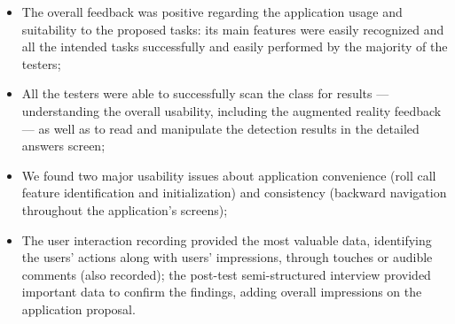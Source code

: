 \begin{itemize}
    \item The overall feedback was positive regarding the application usage and suitability to the proposed tasks: its main features were easily recognized and all the intended tasks successfully and easily performed by the majority of the testers;

    \item All the testers were able to successfully scan the class for results --- understanding the overall usability, including the augmented reality feedback --- as well as to read and manipulate the detection results in the detailed answers screen;

    \item We found two major usability issues about application convenience (roll call feature identification and initialization) and consistency (backward navigation throughout the application's screens);

    \item The user interaction recording provided the most valuable data, identifying the users' actions along with users' impressions, through touches or audible comments (also recorded); the post-test semi-structured interview provided important data to confirm the findings, adding overall impressions on the application proposal.
\end{itemize}






